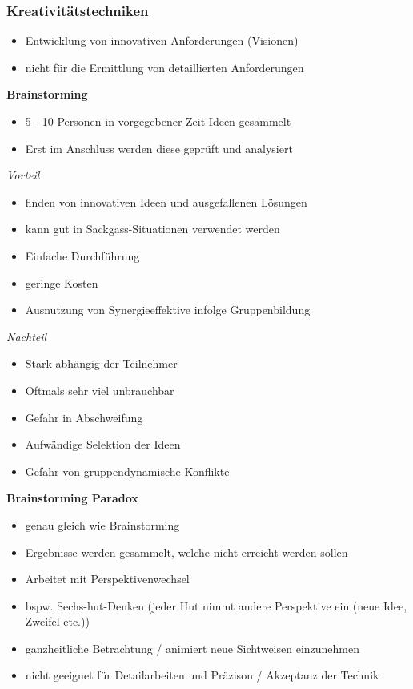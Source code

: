 \documentclass{report}
\theoremstyle{definition}
\theoremstyle{example}
\begin{document}
\subsubsection{Kreativitätstechniken}
\begin{itemize}
   \item Entwicklung von innovativen Anforderungen (Visionen)
   \item nicht für die Ermittlung von detaillierten Anforderungen
\end{itemize}

\textbf{Brainstorming}
\begin{itemize}
   \item 5 - 10 Personen in vorgegebener Zeit Ideen gesammelt
   \item Erst im Anschluss werden diese geprüft und analysiert
\end{itemize}
\textit{Vorteil}
\begin{itemize}
   \item finden von innovativen Ideen und ausgefallenen Lösungen
   \item kann gut in Sackgass-Situationen verwendet werden
   \item Einfache Durchführung
   \item geringe Kosten
   \item Ausnutzung von Synergieeffektive infolge Gruppenbildung
\end{itemize}
\textit{Nachteil}
\begin{itemize}
   \item Stark abhängig der Teilnehmer
   \item Oftmals sehr viel unbrauchbar
   \item Gefahr in Abschweifung
   \item Aufwändige Selektion der Ideen
   \item Gefahr von gruppendynamische Konflikte
\end{itemize}

\textbf{Brainstorming Paradox}
\begin{itemize}
   \item genau gleich wie Brainstorming
   \item Ergebnisse werden gesammelt, welche nicht erreicht werden sollen
\end{itemize}

\begin{itemize}
   \item Arbeitet mit Perspektivenwechsel
   \item bspw. Sechs-hut-Denken (jeder Hut nimmt andere Perspektive ein (neue Idee, Zweifel etc.))
   \item ganzheitliche Betrachtung / animiert neue Sichtweisen einzunehmen
   \item nicht geeignet für Detailarbeiten und Präzison / Akzeptanz der Technik
\end{itemize}
\end{document}
